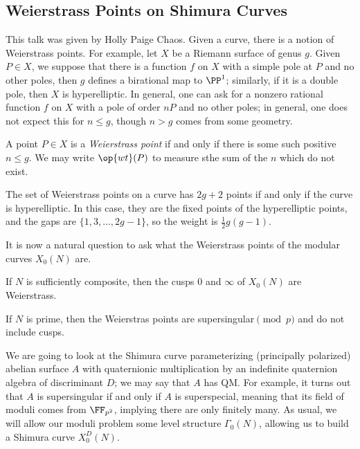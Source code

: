 \documentclass{article}
\begin{document}
\subsection{Weierstrass Points on Shimura Curves}
This talk was given by Holly Paige Chaos. Given a curve, there is a notion of Weierstrass points. For example, let $X$ be a Riemann surface of genus $g$. Given $P\in X$, we suppose that there is a function $f$ on $X$ with a simple pole at $P$ and no other poles, then $g$ defines a birational map to $\PP^1$; similarly, if it is a double pole, then $X$ is hyperelliptic. In general, one can ask for a nonzero rational function $f$ on $X$ with a pole of order $nP$ and no other poles; in general, one does not expect this for $n\le g$, though $n>g$ comes from some geometry.
\begin{definition}
	A point $P\in X$ is a \textit{Weierstrass point} if and only if there is some such positive $n\le g$. We may write $\op{wt}(P)$ to measure sthe sum of the $n$ which do not exist.
\end{definition}
\begin{example}
	The set of Weierstrass points on a curve has $2g+2$ points if and only if the curve is hyperelliptic. In this case, they are the fixed points of the hyperelliptic points, and the gaps are $\{1,3,\ldots,2g-1\}$, so the weight is $\frac12g(g-1)$.
\end{example}
It is now a natural question to ask what the Weierstrass points of the modular curves $X_0(N)$ are.
\begin{theorem}
	If $N$ is sufficiently composite, then the cusps $0$ and $\infty$ of $X_0(N)$ are Weierstrass.
\end{theorem}
\begin{theorem}[Ogg]
	If $N$ is prime, then the Weierstras points are supersingular$\pmod p$ and do not include cusps.
\end{theorem}
We are going to look at the Shimura curve parameterizing (principally polarized) abelian surface $A$ with quaternionic multiplication by an indefinite quaternion algebra of discriminant $D$; we may say that $A$ has QM. For example, it turns out that $A$ is supersingular if and only if $A$ is superspecial, meaning that its field of moduli comes from $\FF_{p^2}$, implying there are only finitely many. As usual, we will allow our moduli problem some level structure $\Gamma_0(N)$, allowing us to build a Shimura curve $X_0^D(N)$.
\end{document}
